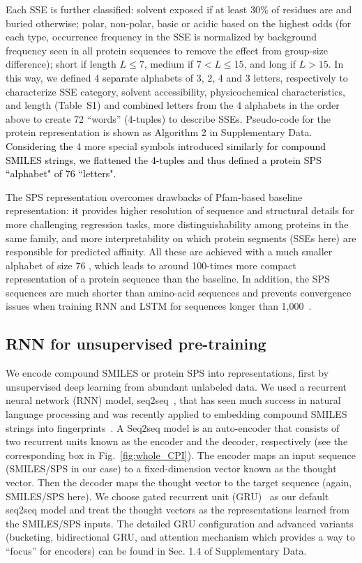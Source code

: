 \documentclass[nocrop]{bioinfo}
\newcommand{\red}[1]{\textcolor{black}{#1}}
\begin{document}
Each SSE is further classified: solvent exposed if at least 30\% of residues are and buried otherwise; polar, non-polar, basic or acidic based on the highest odds  (for each type, occurrence frequency in the SSE is normalized by background frequency seen in all protein sequences to remove the effect from group-size difference); short if length $L \leqslant 7$, medium if $7 < L \leqslant 15$, and long if $L > 15$.  In this way, we defined 4 \red{separate} alphabets of 3, 2, 4 and 3 letters, respectively to characterize SSE category, solvent accessibility, physicochemical characteristics, and length  (Table~\red{S1}) and combined letters from the 4 alphabets in the order above to create 72 ``words''  (4-tuples) to describe SSEs. 
Pseudo-code for the protein representation is shown as Algorithm 2 in Supplementary Data. \red{Considering the} 4 more special symbols introduced \red{similarly for compound SMILES strings, we flattened the 4-tuples and thus defined a protein SPS ``alphabet" of 76 ``letters".}

The SPS representation overcomes drawbacks of Pfam-based baseline representation: it provides higher resolution of sequence and structural details for more challenging regression tasks, more distinguishability among proteins in the same family, and more interpretability on which protein segments  (SSEs here) are responsible for predicted affinity.  All these are achieved with a much smaller alphabet of size 76
, which leads to around 100-times more compact representation of a protein sequence than the baseline. 
In addition, the SPS sequences are much shorter than amino-acid sequences and prevents convergence issues when training RNN and LSTM for sequences longer than 1,000~\citep{IndRNN}.


\vspace{-1em}
\subsection{RNN for unsupervised pre-training}



We encode compound SMILES or protein SPS into representations, first by unsupervised deep learning from abundant unlabeled data. We used a recurrent neural network  (RNN) model, seq2seq~\citep{sutskever2014sequence}, that has seen much success in natural language processing and was recently applied to embedding compound SMILES strings into fingerprints~\citep{xu2017seq2seq}. 
A Seq2seq model is an auto-encoder that consists of two recurrent units known as the encoder and the decoder, respectively  (see the corresponding box in Fig.~\ref{fig:whole_CPI}). 
The encoder maps an input sequence   (SMILES/SPS in our case) to a fixed-dimension vector known as the thought vector. Then the decoder maps the thought vector to the target sequence  (again, SMILES/SPS here). We choose gated recurrent unit  (GRU)~\citep{cho2014properties} as our default seq2seq model and treat the thought vectors as the representations learned from the SMILES/SPS inputs. The detailed GRU configuration and advanced variants  (bucketing, bidirectional GRU, and  attention mechanism which provides a way to ``focus'' for encoders) can be found in Sec. 1.4 of Supplementary Data.
\end{document}
